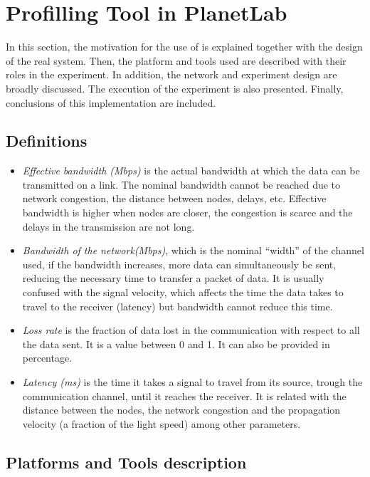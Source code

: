 
\section{Profilling Tool in PlanetLab}
\label{sec:planetlab}
In this section, the motivation for the use of \pl is explained together
with the design of the real system. Then, the platform and tools used are
described with their roles in the experiment. In addition, the network and
experiment design are broadly discussed. The execution of the experiment is also
presented. Finally, conclusions of this implementation are included.


\subsection{Definitions}
\begin{itemize}
\item\emph{Effective bandwidth (Mbps)} is the actual bandwidth at which the data
  can be transmitted on a link. The nominal bandwidth cannot be reached due to
  network congestion, the distance between nodes, delays, etc. Effective bandwidth is higher when nodes are closer, the congestion is scarce and the delays in the transmission are not long.
\item\emph{Bandwidth of the network(Mbps)}, which is the nominal ``width'' of the channel used, if the bandwidth increases, more data can simultaneously be sent, reducing the necessary time to transfer a packet of data. It is usually confused with the signal velocity, which affects the time the data takes to travel to the receiver (latency) but bandwidth cannot reduce this time.
\item\emph{Loss rate} is the fraction of data lost in the communication with respect
to all the data sent. It is a value between 0 and 1. It can also be provided in
percentage.

\item\emph{Latency (ms)} is the time it takes a signal to travel from its source, trough the communication channel, until it reaches the receiver. It is related with the distance between the nodes, the network congestion and the propagation velocity (a fraction of the light speed) among other parameters. 
\end{itemize}

\subsection{Platforms and Tools description}

